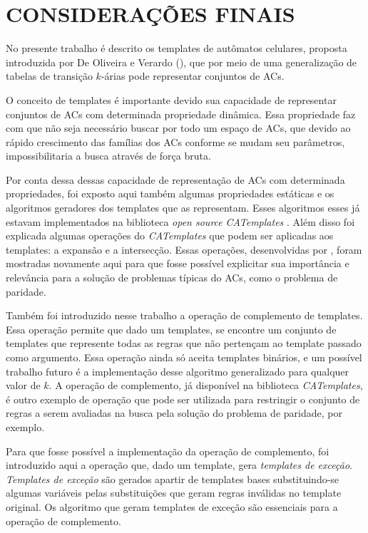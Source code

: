 \documentclass[12pt,a4paper]{article}
\let\stdsection\section
\renewcommand\section{\newpage\stdsection}
\begin{document}
\section{CONSIDERAÇÕES FINAIS}\label{sec:conclusao}%
No presente trabalho é descrito os templates de autômatos celulares, proposta introduzida por De Oliveira e Verardo (\citeyear{deOliveira2014}), que por meio de uma generalização de tabelas de transição $k$-árias pode representar conjuntos de ACs.

O conceito de templates é importante devido sua capacidade de representar conjuntos de ACs com determinada propriedade dinâmica. Essa propriedade faz com que não seja necessário buscar por todo um espaço de ACs, que devido ao rápido crescimento das famílias dos ACs conforme se mudam seu parâmetros, impossibilitaria a busca através de força bruta.

Por conta dessa dessas capacidade de representação de ACs com determinada propriedades, foi exposto aqui também algumas propriedades estáticas e os algoritmos geradores dos templates que as representam. Esses algoritmos esses já estavam implementados na biblioteca \textit{open source} \textit{CATemplates} \cite{CATemplates}. Além disso foi explicada algumas operações do \textit{CATemplates} que podem ser aplicadas aos templates: a expansão e a intersecção. Essas operações, desenvolvidas por , foram mostradas novamente aqui para que fosse possível explicitar sua importância e relevância para a solução de problemas típicas do ACs, como o problema de paridade.

Também foi introduzido nesse trabalho a operação de complemento de templates. Essa operação permite que dado um templates, se encontre um conjunto de templates que represente todas as regras que não pertençam ao template passado como argumento. Essa operação ainda só aceita templates binários, e um possível trabalho futuro é a implementação desse algoritmo generalizado para qualquer valor de $k$. A operação de complemento, já disponível na biblioteca \textit{CATemplates}, é outro exemplo de operação que pode ser utilizada para restringir o conjunto de regras a serem avaliadas na busca pela solução do problema de paridade, por exemplo.

Para que fosse possível a implementação da operação de complemento, foi introduzido aqui a operação que, dado um template, gera \textit{templates de exceção}. \textit{Templates de exceção} são gerados apartir de templates bases substituindo-se algumas variáveis pelas substituições que geram regras inválidas no template original. Os algoritmo que geram templates de exceção são essenciais para a operação de complemento.
\end{document}

